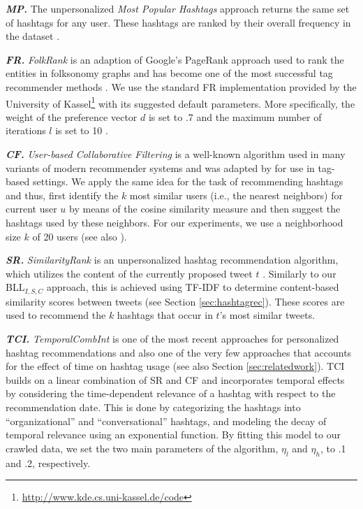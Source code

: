 \documentclass{sig-alternate-05-2015}
\newcommand{\subpara}[1]{\textit{\textbf{#1}}}
\begin{document}
\subpara{MP.} The unpersonalized \textit{Most Popular Hashtags} approach returns the same set of hashtags for any user. These hashtags are ranked by their overall frequency in the dataset \cite{jaschke2008tag}.

\subpara{FR.} \textit{FolkRank} is an adaption of Google's PageRank approach used to rank the entities in folksonomy graphs and has become one of the most successful tag recommender methods \cite{hotho2006folkrank}. %
We use the standard FR implementation provided by the University of Kassel\footnote{\url{http://www.kde.cs.uni-kassel.de/code}} with its suggested default parameters. More specifically, the weight of the preference vector $d$ is set to .7 and the maximum number of iterations $l$ is set to 10 \cite{jaschke2008tag}.

\subpara{CF.} \textit{User-based Collaborative Filtering} is a well-known algorithm used in many variants of modern recommender systems and was adapted by \cite{marinho2008collaborative} for use in tag-based settings. We apply the same idea for the task of recommending hashtags and thus, first identify the $k$ most similar users (i.e., the nearest neighbors) for current user $u$ by means of the cosine similarity measure and then suggest the hashtags used by these neighbors. For our experiments, we use a neighborhood size $k$ of 20 users (see also \cite{gemmell2009improving}).

\subpara{SR.} \textit{SimilarityRank} is an unpersonalized hashtag recommendation algorithm, which utilizes the content of the currently proposed tweet $t$ \cite{zangerle2011recommending}. Similarly to our BLL$_{I,S,C}${} approach, this is achieved using TF-IDF to determine content-based similarity scores between tweets (see Section \ref{sec:hashtagrec}). These scores are used to recommend the $k$ hashtags that occur in $t$'s most similar tweets.


\subpara{TCI.} \textit{TemporalCombInt} is one of the most recent approaches for personalized hashtag recommendations and also one of the very few approaches that accounts for the effect of time on hashtag usage \cite{harvey2015long} (see also Section \ref{sec:relatedwork}). TCI builds on a linear combination of SR and CF and incorporates temporal effects by considering the time-dependent relevance of a hashtag with respect to the recommendation date. This is done by categorizing the hashtags into ``organizational'' and ``conversational'' hashtags, and modeling the decay of temporal relevance using an exponential function. By fitting this model to our crawled data, we set the two main parameters of the algorithm, $\eta_l$ and $\eta_h$, to .1 and .2, respectively. 
\end{document}
